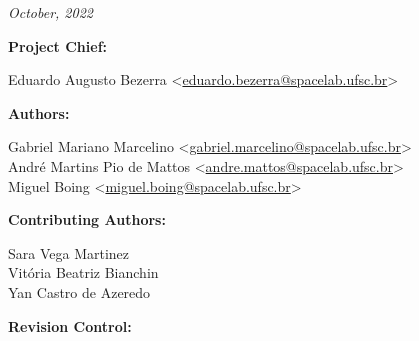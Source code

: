%
%
%
%
%

%
%
%
%
%

\thispagestyle{empty}

\begin{center}

\textbf{\thetitle}

\textit{October, 2022}

\vspace{1cm}

\textbf{Project Chief:}

Eduardo Augusto Bezerra <\href{mailto:eduardo.bezerra@spacelab.ufsc.br}{eduardo.bezerra@spacelab.ufsc.br}>

\vspace{1cm}

\textbf{Authors:}

Gabriel Mariano Marcelino <\href{mailto:gabriel.marcelino@spacelab.ufsc.br}{gabriel.marcelino@spacelab.ufsc.br}> \\
André Martins Pio de Mattos <\href{mailto:andre.mattos@spacelab.ufsc.br}{andre.mattos@spacelab.ufsc.br}> \\
Miguel Boing <\href{mailto:miguel.boing@spacelab.ufsc.br}{miguel.boing@spacelab.ufsc.br}> \\

\vspace{1cm}

\textbf{Contributing Authors:}

Sara Vega Martinez \\
Vitória Beatriz Bianchin \\
Yan Castro de Azeredo \\

\vspace{1cm}

\textbf{Revision Control:}

\end{center}


